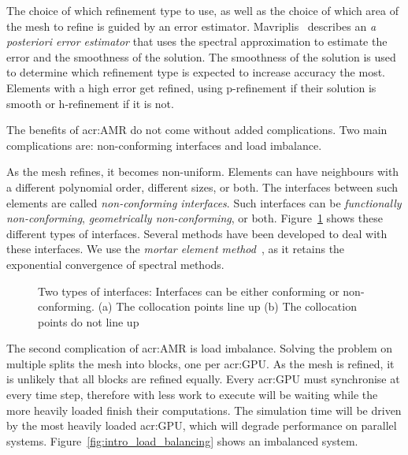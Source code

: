 The choice of which refinement type to use, as well as the choice of which area of the mesh to
refine is guided by an error estimator. Mavriplis~\cite{Mavriplis1990} describes an \textit{a
posteriori error estimator} that uses the spectral approximation to estimate the error and the
smoothness of the solution. The smoothness of the solution is used to determine which refinement
type is expected to increase accuracy the most. Elements with a high error get refined, using
p-refinement if their solution is smooth or h-refinement if it is not.

The benefits of \acrshort{acr:AMR} do not come without added complications. Two main complications
are: non-conforming interfaces and load imbalance.

As the mesh refines, it becomes non-uniform. Elements can have neighbours with a different
polynomial order, different sizes, or both. The interfaces between such elements are called
\textit{non-conforming interfaces}. Such interfaces can be \textit{functionally non-conforming},
\textit{geometrically non-conforming}, or both. Figure~\ref{fig:intro_interfaces} shows these
different types of interfaces. Several methods have been developed to deal with these interfaces. We
use the \textit{mortar element method}~\cite{Maday1989}, as it retains the exponential convergence
of spectral methods.

\begin{figure}[H]
	\centering
	\hfill
	\caption{Two types of interfaces: Interfaces can be either conforming or non-conforming. (a) The collocation points line up (b) The collocation points do not line up}\label{fig:intro_interfaces}
\end{figure}

The second complication of \acrshort{acr:AMR} is load imbalance. Solving the problem on multiple
 splits the mesh into blocks, one per \acrshort{acr:GPU}. As the mesh is
refined, it is unlikely that all blocks are refined equally. Every \acrshort{acr:GPU} must
synchronise at every time step, therefore  with less work to execute will be
waiting while the more heavily loaded  finish their computations. The simulation
time will be driven by the most heavily loaded \acrshort{acr:GPU}, which will degrade performance on
parallel systems. Figure~\ref{fig:intro_load_balancing} shows an imbalanced system.

